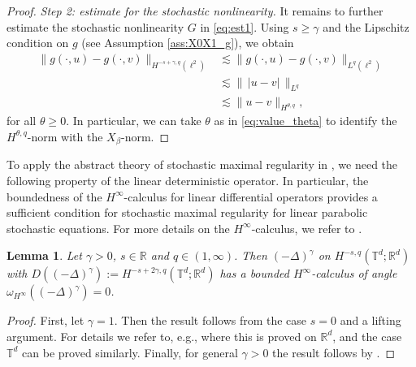 \documentclass[11pt, a4paper,oneside, reqno]{amsart}
\newtheorem{lemma}[theorem]{Lemma}
\theoremstyle{remark} %
\theoremstyle{definition} %
\numberwithin{theorem}{section}
\numberwithin{equation}{section}
\newcommand{\om}{\omega}
\newcommand{\T}{\mathbb{T}}
\newcommand{\Hinf}{H^{\infty}}
\newcommand{\RR}{\mathbb{R}}
\newcommand{\RRd}{\RR^d}
\newcommand{\del}{\Delta}
\newcommand{\gam}{\gamma}
\begin{document}
\begin{proof}
\textit{Step 2: estimate for the stochastic nonlinearity.} It remains to further estimate the stochastic nonlinearity $G$ in \eqref{eq:est1}. Using $s\geq \gam$ and the Lipschitz condition on $g$ (see Assumption \ref{ass:X0X1_g}), we obtain
    \begin{align*}
        \|g(\cdot, u)-g(\cdot, v)\|_{H^{-s+\gam,q}(\ell^2)}&\lesssim \|g(\cdot, u)-g(\cdot, v)\|_{L^q(\ell^2)}\\
        &\lesssim \|\, |u-v|\, \|_{L^q}\\
        &\lesssim \|u-v\|_{H^{\theta, q}},
    \end{align*}
    for all $\theta\geq 0$. In particular, we can take $\theta$ as in \eqref{eq:value_theta} to identify the $H^{\theta, q}$-norm with the $X_\beta$-norm.
\end{proof}


To apply the abstract theory of stochastic maximal regularity in \cite{AV22, AV22_part2, AV25_survey}, we need the following property of the linear deterministic operator. In particular, the boundedness of the $\Hinf$-calculus for linear differential operators provides a sufficient condition for stochastic maximal regularity for linear parabolic stochastic equations. For more details on the $\Hinf$-calculus, we refer to \cite[Chapter 10]{HNVW17}.
\begin{lemma}\label{lem:calculus}
Let $\gam>0$, $s\in\RR$ and $q\in(1,\infty)$. Then $(-\del)^\gam$ on $H^{-s,q}(\T^d;\RRd)$ with $D((-\del)^\gam):= H^{-s+2\gam,q}(\T^d;\RRd)$ has a bounded $\Hinf$-calculus of angle $\om_{\Hinf}((-\del)^\gam)=0$.
\end{lemma}
\begin{proof} First, let $\gam=1$. Then the result follows from the case $s=0$ and a lifting argument. For details we refer to, e.g., \cite[Lemma 2.6]{LLRV24} where this is proved on $\RR^d$, and the case $\T^d$ can be proved similarly. Finally, for general  $\gam>0$ the result follows by \cite[Proposition 15.2.11]{HNVW24}.
\end{proof}
\end{document}
